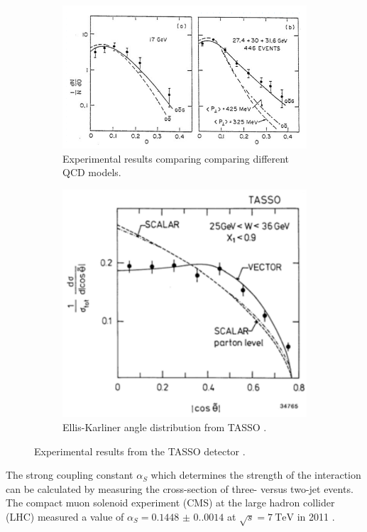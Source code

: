 \begin{figure}
    \centering
    \begin{subfigure}[B]{.5\textwidth}   %
        \centering
        \includegraphics[width=1.1\textwidth]{figs/gluonResultsA.png}
        \caption{Experimental results comparing comparing different QCD models\cite{Branson:1994eu}.}
        \label{fig:GluonResultsA}
    \end{subfigure}
    \begin{subfigure}[B]{.45\textwidth}   %
        \centering
        \includegraphics[width=.8\textwidth]{figs/gluonResultsB.png}
        \caption{Ellis-Karliner angle distribution from TASSO \cite{Soding:1996zk}.}
        \label{fig:GluonResultsB}
    \end{subfigure}
    \caption{Experimental results from the TASSO detector \cite{Branson:1994eu, Soding:1996zk}.}
    \label{fig:resultsGluonBoth}
\end{figure}

The strong coupling constant $\alpha_S$ which determines the strength of the interaction can be calculated by measuring the cross-section of three- versus two-jet events.
The compact muon solenoid experiment (CMS) at the large hadron collider (LHC) measured a value of $\alpha_S=\num{0.1448(0.0014)}$ at $\sqrt s=\SI{7}{\tera\eV}$ in 2011 \cite{CMS:2013vbb}.
